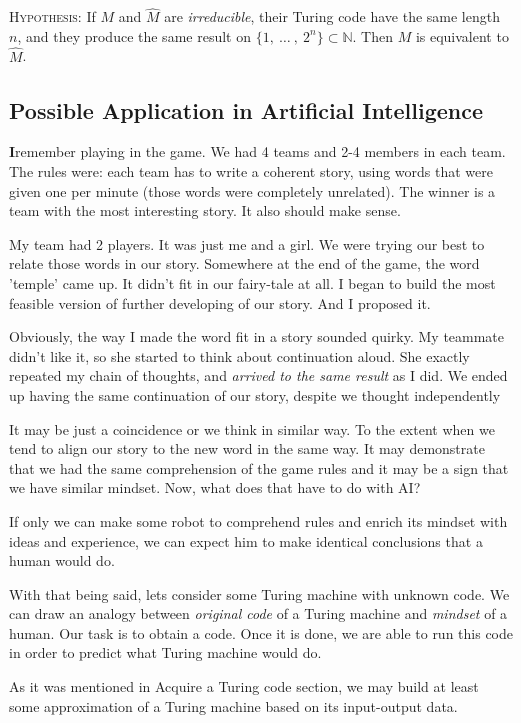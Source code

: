 \documentclass[12pt]{article}
\begin{document}
\textsc{Hypothesis}: If $M$ and $\hat{M}$ are \emph{irreducible}, their Turing code have the same length $n$, and they produce the same result on $\{1,\ \dots\ ,\ 2^n\}\subset\mathbb{N}$. Then $M$ is equivalent to $\hat{M}$.

\subsection{Possible Application in Artificial Intelligence}
\textbf{\large I}remember playing in the game. We had 4 teams and 2-4 members in each team. The rules were: each team has to write a coherent story, using words that were given one per minute (those words were completely unrelated). The winner is a team with the most interesting story. It also should make sense.

My team had 2 players. It was just me and a girl. We were trying our best to relate those words in our story. Somewhere at the end of the game, the word 'temple' came up. It didn't fit in our fairy-tale at all. I began to build the most feasible version of further developing of our story. And I proposed it.

Obviously, the way I made the word fit in a story sounded quirky. My teammate didn't like it, so she started to think about continuation aloud. She exactly repeated my chain of thoughts, and \emph{arrived to the same result} as I did. We ended up having the same continuation of our story, despite we thought independently

It may be just a coincidence or we think in similar way. To the extent when we tend to align our story to the new word in the same way. It may demonstrate that we had the same comprehension of the game rules and it may be a sign that we have similar mindset. Now, what does that have to do with AI?

If only we can make some robot to comprehend rules and enrich its mindset with ideas and experience, we can expect him to make identical conclusions that a human would do.

With that being said, lets consider some Turing machine with unknown code. We can draw an analogy between \emph{original code} of a Turing machine and \emph{mindset} of a human. Our task is to obtain a code. Once it is done, we are able to run this code in order to predict what Turing machine would do.

As it was mentioned in \textsf{Acquire a Turing code
} section, we may build at least some approximation of a Turing machine based on its input-output data.
\end{document}
